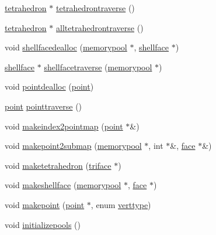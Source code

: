 \begin{DoxyCompactItemize}
\hyperlink{classtetgenmesh_a6a12b1c0d1834ca941d16c62e949e5e3}{tetrahedron} $\ast$ \hyperlink{classtetgenmesh_a601e53c66c0bfc71939ec966762cedb8}{tetrahedrontraverse} ()
\item 
\hyperlink{classtetgenmesh_a6a12b1c0d1834ca941d16c62e949e5e3}{tetrahedron} $\ast$ \hyperlink{classtetgenmesh_a74efb7548edfe0dd14072cdeca435f60}{alltetrahedrontraverse} ()
\item 
void \hyperlink{classtetgenmesh_ab368f639981dcf465b5e8654942bcc69}{shellfacedealloc} (\hyperlink{classtetgenmesh_1_1memorypool}{memorypool} $\ast$, \hyperlink{classtetgenmesh_ad4860123b88783b943fa6452e886a2cb}{shellface} $\ast$)
\item 
\hyperlink{classtetgenmesh_ad4860123b88783b943fa6452e886a2cb}{shellface} $\ast$ \hyperlink{classtetgenmesh_a1b4a67449a4fcfe5689e91d885cc882e}{shellfacetraverse} (\hyperlink{classtetgenmesh_1_1memorypool}{memorypool} $\ast$)
\item 
void \hyperlink{classtetgenmesh_abafc92933f5d33791abeca5eb0a7cc05}{pointdealloc} (\hyperlink{classtetgenmesh_ace3fb4f80389185b7c9b18ab69a3dea2}{point})
\item 
\hyperlink{classtetgenmesh_ace3fb4f80389185b7c9b18ab69a3dea2}{point} \hyperlink{classtetgenmesh_a7bd734fc770dd934f66b4837df45d242}{pointtraverse} ()
\item 
void \hyperlink{classtetgenmesh_a0a278dbd160df620cfe93fd3eed5e9da}{makeindex2pointmap} (\hyperlink{classtetgenmesh_ace3fb4f80389185b7c9b18ab69a3dea2}{point} $\ast$\&)
\item 
void \hyperlink{classtetgenmesh_a20c595345b290a1d08c29e4d3a0e0500}{makepoint2submap} (\hyperlink{classtetgenmesh_1_1memorypool}{memorypool} $\ast$, int $\ast$\&, \hyperlink{classtetgenmesh_1_1face}{face} $\ast$\&)
\item 
void \hyperlink{classtetgenmesh_aa1a1561e6fde22070832ae038976067b}{maketetrahedron} (\hyperlink{classtetgenmesh_1_1triface}{triface} $\ast$)
\item 
void \hyperlink{classtetgenmesh_a98c862e8bb1f1c25e03bb550804028cd}{makeshellface} (\hyperlink{classtetgenmesh_1_1memorypool}{memorypool} $\ast$, \hyperlink{classtetgenmesh_1_1face}{face} $\ast$)
\item 
void \hyperlink{classtetgenmesh_ac6115b981e63664fe06c4a1d4b541737}{makepoint} (\hyperlink{classtetgenmesh_ace3fb4f80389185b7c9b18ab69a3dea2}{point} $\ast$, enum \hyperlink{classtetgenmesh_ad0458f823a5eef2de89c7fae067aa2ac}{verttype})
\item 
void \hyperlink{classtetgenmesh_a0ed29d97e57db7035017c312dc6aaa2f}{initializepools} ()

\end{DoxyCompactItemize}
